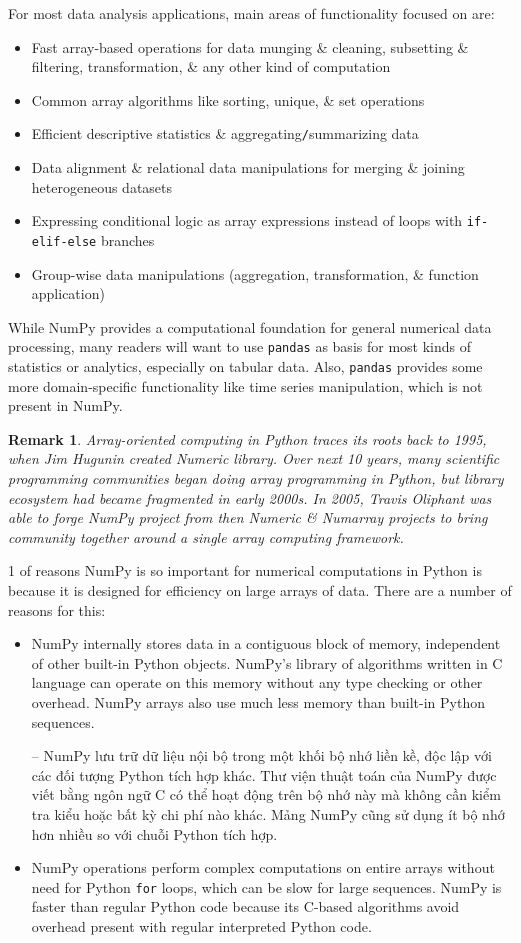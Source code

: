 \documentclass{article}
\newtheorem{remark}{Remark}
\begin{document}
\begin{enumerate}
\begin{itemize}
		For most data analysis applications, main areas of functionality focused on are:
		\begin{itemize}
			\item Fast array-based operations for data munging \& cleaning, subsetting \& filtering, transformation, \& any other kind of computation
			\item Common array algorithms like sorting, unique, \& set operations
			\item Efficient descriptive statistics \& aggregating{\tt/}summarizing data
			\item Data alignment \& relational data manipulations for merging \& joining heterogeneous datasets
			\item Expressing conditional logic as array expressions instead of loops with {\tt if-elif-else} branches
			\item Group-wise data manipulations (aggregation, transformation, \& function application)
		\end{itemize}
		While NumPy provides a computational foundation for general numerical data processing, many readers will want to use {\tt pandas} as basis for most kinds of statistics or analytics, especially on tabular data. Also, {\tt pandas} provides some more domain-specific functionality like time series manipulation, which is not present in NumPy.
		\begin{remark}
			Array-oriented computing in Python traces its roots back to 1995, when {\sc Jim Hugunin} created Numeric library. Over next 10 years, many scientific programming communities began doing array programming in Python, but library ecosystem had became fragmented in early 2000s. In 2005, {\sc Travis Oliphant} was able to forge NumPy project from then Numeric \& Numarray projects to bring community together around a single array computing framework.
		\end{remark}
		1 of reasons NumPy is so important for numerical computations in Python is because it is designed for efficiency on large arrays of data. There are a number of reasons for this:
		\begin{itemize}
			\item NumPy internally stores data in a contiguous block of memory, independent of other built-in Python objects. NumPy's library of algorithms written in C language can operate on this memory without any type checking or other overhead. NumPy arrays also use much less memory than built-in Python sequences.
			
			-- NumPy lưu trữ dữ liệu nội bộ trong một khối bộ nhớ liền kề, độc lập với các đối tượng Python tích hợp khác. Thư viện thuật toán của NumPy được viết bằng ngôn ngữ C có thể hoạt động trên bộ nhớ này mà không cần kiểm tra kiểu hoặc bất kỳ chi phí nào khác. Mảng NumPy cũng sử dụng ít bộ nhớ hơn nhiều so với chuỗi Python tích hợp.
			\item NumPy operations perform complex computations on entire arrays without need for Python {\tt for} loops, which can be slow for large sequences. NumPy is faster than regular Python code because its C-based algorithms avoid overhead present with regular interpreted Python code.
			

\end{itemize}
\end{itemize}
\end{enumerate}
\end{document}
